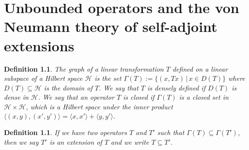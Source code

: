 \documentclass[12pt,oneside]{report}
\newtheorem{defn}[thm]{Definition}
\begin{document}

\chapter{Unbounded operators and the von Neumann theory of self-adjoint extensions}

\begin{defn}
    The graph of a linear transformation $T$ defined on a linear subspace of a Hilbert space $\mathscr{H}$ is the set $\Gamma(T) := \{ (x, Tx) \, | \, x \in D(T) \}$ where $D(T) \subseteq \mathscr{H}$ is the domain of $T$. We say that $T$ is densely defined if $D(T)$ is dense in $\mathscr{H}$. We say that an operator $T$ is closed if $\Gamma(T)$ is a closed set in $\mathscr{H} \times \mathscr{H}$, which is a Hilbert space under the inner product $\langle (x,y), (x',y') \rangle = \langle x,x' \rangle + \langle y,y' \rangle$.
\end{defn}

\begin{defn}
    If we have two operators $T$ and $T'$ such that $\Gamma(T) \subseteq \Gamma(T')$, then we say $T'$ is an extension of $T$ and we write $T \subseteq T'$.
\end{defn}
\end{document}
